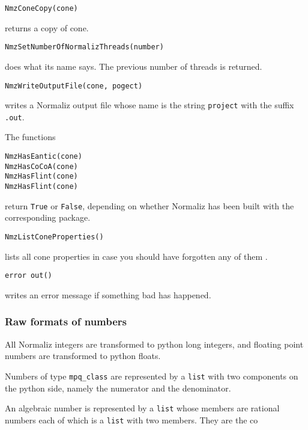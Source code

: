 \documentclass[12pt,a4paper]{scrartcl}
\theoremstyle{definition}
\begin{document}
\begin{small}
\begin{Verbatim}
NmzConeCopy(cone)
\end{Verbatim}
returns a copy of cone.

\begin{Verbatim}
NmzSetNumberOfNormalizThreads(number)
\end{Verbatim}
does what its name says. The previous number of threads is returned.

\begin{Verbatim}
NmzWriteOutputFile(cone, pogect)
\end{Verbatim}
writes a Normaliz output file whose name is the string \verb|project| with the suffix \verb|.out|.


The functions
\begin{Verbatim}
NmzHasEantic(cone)
NmzHasCoCoA(cone)
NmzHasFlint(cone)
NmzHasFlint(cone)
\end{Verbatim}
return \verb|True| or \verb|False|, depending on whether Normaliz has been built with the corresponding package.

\begin{Verbatim}
NmzListConeProperties() 
\end{Verbatim} 
lists all cone properties in case you should have forgotten any of them .

\begin{Verbatim}
error out()
\end{Verbatim}
writes an error message if something bad has happened.

\subsubsection{Raw formats of numbers}

All Normaliz integers are transformed to python long integers, and floating point numbers are transformed to python floats.

Numbers of type \verb|mpq_class| are represented by a \verb|list| with two components on the python side, namely the numerator and the denominator.

An algebraic number is represented by a \verb|list| whose members are rational numbers each of which is a \verb|list| with two members. They are the co

\end{small}

\newpage
\end{document}
